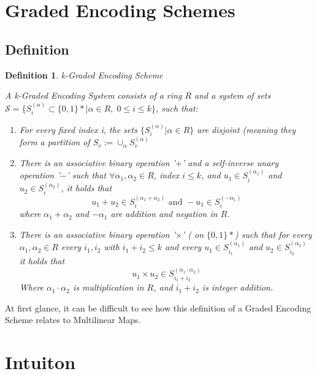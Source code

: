 \documentclass[12pt,twoside]{reedthesis}
\newtheorem{definition}{Definition}
\begin{document}
    \section{Graded Encoding Schemes}
    
    \subsection{Definition}
    \begin{definition}{k-Graded Encoding Scheme}
    \par A k-Graded Encoding System consists of a ring $R$ and a system of sets $\mathcal{S}= \{S_i^{(\alpha)} \subset \{0,1\}*| \alpha \in R, \; 0 \leq i \leq k \}$, such that:
    \begin{enumerate}
    \item For every fixed index i, the sets $\{S_i^{(\alpha)}| \alpha \in R \}$ are disjoint (meaning they form a partition of $S_v := \cup_\alpha S_v^{(\alpha)}$
    
    \item There is an associative binary operation '$ + $' and a self-inverse unary operation '$-$' such that $\forall \alpha_1,\alpha_2 \in R$, index $i\leq k$, and $u_1 \in S_i^{(\alpha_1)}$ and $u_2 \in S_i^{(\alpha_2)}$, it holds that 
    $$u_1 + u_2 \in S_i^{(\alpha_1 + \alpha_2)} \text{ and } -u_1 \in S_i^{(-\alpha_1)}$$
    where $\alpha_1 + \alpha_2$ and $-\alpha_1$ are addition and negation in $R$.
    
    \item There is an associative binary operation '$\times$' ( on $\{ 0,1 \}*$) such that for every $\alpha_1,\alpha_2 \in R$ every $i_1,i_2$ with $i_1+i_2 \leq k$ and every $u_1 \in S_{i_1}^{(\alpha_1)}$ and $u_2 \in S_{i_2}^{(\alpha_2)}$ it holds that 
    $$u_1 \times u_2 \in S_{i_1 + i_2}^{(\alpha_1 \cdot \alpha_2)} $$
    Where $\alpha_1 \cdot \alpha_2$ is multiplication in $R$, and $i_1 + i_2$ is integer addition.
    
    
    \end{enumerate}
    
    
    \end{definition}
    
    At first glance, it can be difficult to see how this definition of a Graded Encoding Scheme relates to Multilinear Maps.    
    
    
    \section{Intuiton}
    
\end{document}
